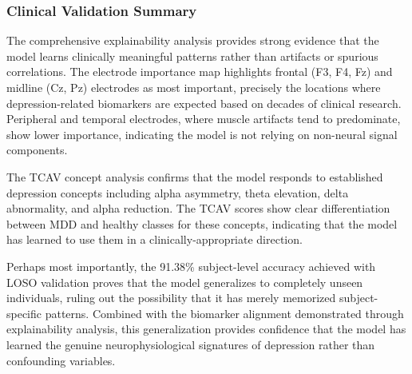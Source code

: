 \subsubsection{Clinical Validation Summary}

The comprehensive explainability analysis provides strong evidence that the model learns clinically meaningful patterns rather than artifacts or spurious correlations. The electrode importance map highlights frontal (F3, F4, Fz) and midline (Cz, Pz) electrodes as most important, precisely the locations where depression-related biomarkers are expected based on decades of clinical research. Peripheral and temporal electrodes, where muscle artifacts tend to predominate, show lower importance, indicating the model is not relying on non-neural signal components.

The TCAV concept analysis confirms that the model responds to established depression concepts including alpha asymmetry, theta elevation, delta abnormality, and alpha reduction. The TCAV scores show clear differentiation between MDD and healthy classes for these concepts, indicating that the model has learned to use them in a clinically-appropriate direction.

Perhaps most importantly, the 91.38\% subject-level accuracy achieved with LOSO validation proves that the model generalizes to completely unseen individuals, ruling out the possibility that it has merely memorized subject-specific patterns. Combined with the biomarker alignment demonstrated through explainability analysis, this generalization provides confidence that the model has learned the genuine neurophysiological signatures of depression rather than confounding variables.

